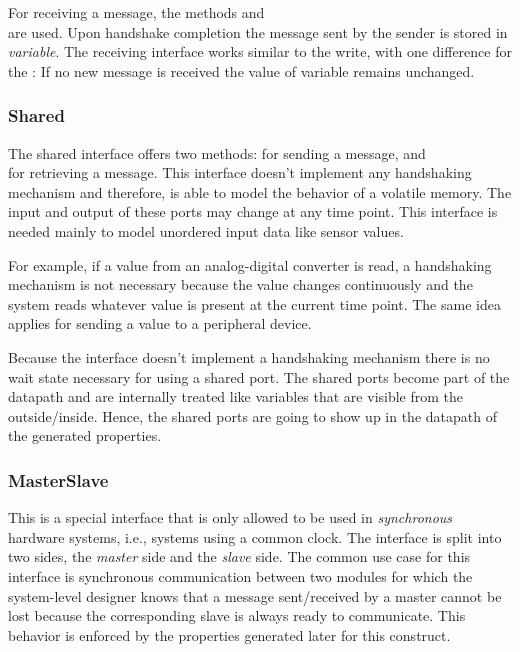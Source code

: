 For receiving a message, the methods  and \\  are used. %
Upon handshake completion the message sent by the sender is stored in \textit{variable}. %
The receiving interface works similar to the write, with one
difference for the :
If no new message is received the value of variable remains unchanged. %

\subsubsection{Shared}

The shared interface offers two methods:
 for sending a message, and \\
 for retrieving a message. %
This interface doesn't implement any handshaking mechanism and therefore, is able to model the behavior of a volatile memory. %
The input and output of these ports may change at any time point. %
This interface is needed mainly to model unordered input data like
sensor values. %

For example, if a value from an analog-digital converter is read, a
handshaking mechanism is not necessary because the value changes
continuously and the system reads whatever value is present at the
current time point. %
The same idea applies for sending a value to a peripheral device. %

Because the interface doesn't implement a handshaking mechanism there
is no wait state necessary for using a shared port. %
The shared ports become part of the datapath and are internally
treated like variables that are visible from the outside/inside. %
Hence, the shared ports are going to show up in the datapath of the
generated properties. %

\subsubsection{MasterSlave}

This is a special interface that is only allowed to be used in
\emph{synchronous} hardware systems, i.e., systems using a common
clock. %
The interface is split into two sides, the \emph{master} side and the
\emph{slave} side. %
The common use case for this interface is synchronous communication
between two modules for which the system-level designer knows that a
message sent/received by a master cannot be lost because the
corresponding slave is always ready to communicate. %
This behavior is enforced by the properties generated later for this
construct. %

